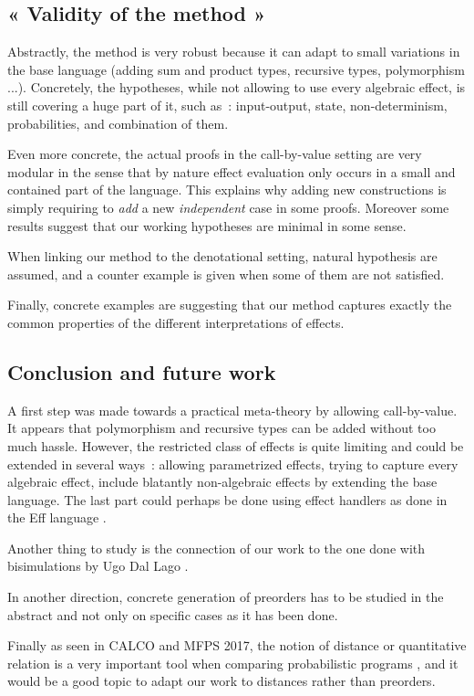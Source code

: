\documentclass{article}
\newenvironment{point}[1]%
{\subsection*{#1}}%
{}
\begin{document}
\begin{point}{« Validity of the method »}
    
    Abstractly, the method is very robust because 
    it can adapt to small variations in the base language 
    (adding sum and product types, recursive types, 
    polymorphism ...). 
    Concretely, the hypotheses, while not allowing to use 
    every algebraic effect, is still covering a huge part of it,
    such as~: input-output, state, non-determinism, probabilities,
    and combination of them. 
    
    Even more concrete, the actual proofs in the call-by-value 
    setting are very modular in the sense that  by nature
    effect evaluation only occurs in a small and contained part 
    of the language. This explains why adding new constructions 
    is simply requiring to \emph{add} a new \emph{independent} case
    in some proofs. Moreover some 
    results suggest that our working hypotheses are minimal in some 
    sense. 

    When linking our method to the denotational setting, 
    natural hypothesis are assumed, and a counter example 
    is given when some of them are not satisfied.

    Finally, concrete examples are suggesting that our 
    method captures exactly the common properties of 
    the different interpretations of effects.
\end{point}


\begin{point}{Conclusion and future work}

    A first step was made towards a practical 
    meta-theory by allowing call-by-value. It appears that polymorphism 
    and recursive types can be added without too much 
    hassle. However, the restricted class of effects 
    is quite limiting and could be extended in several 
    ways~: allowing parametrized effects, 
    trying to capture every algebraic effect, 
    include blatantly non-algebraic effects by extending 
    the base language. The last part could perhaps be done using 
    effect handlers as done in the Eff language \cite{eff2012}.
    
    Another thing to study is the connection of 
    our work to the one done with bisimulations by Ugo Dal Lago \cite{Ugo2017}.
    
    In another direction, concrete generation of preorders 
    has to be studied in the abstract and not only on specific 
    cases as it has been done. 

    Finally as seen in CALCO and MFPS 2017, the notion of distance 
    or quantitative relation \cite{mardare2016quantitative}
    is a very important tool when 
    comparing probabilistic programs \cite{crubille2017metric}, and it would be 
    a good topic to adapt our work to distances rather than preorders.

\end{point}



\end{document}
